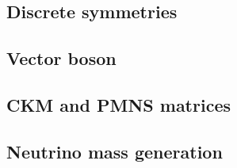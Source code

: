 




\subsection{Discrete symmetries}

\subsection{Vector boson}

\subsection{CKM and PMNS matrices}

\subsection{Neutrino mass generation}   
